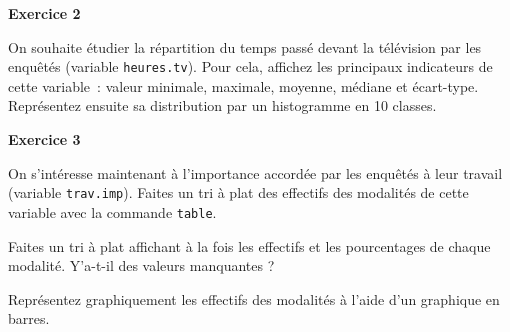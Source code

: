 \documentclass[12pt,]{book}
\newenvironment{Shaded}{\begin{snugshade}}{\end{snugshade}}
\newcommand{\DataTypeTok}[1]{\textcolor[rgb]{0.27,0.27,0.27}{#1}}
\newcommand{\DecValTok}[1]{\textcolor[rgb]{0.06,0.06,0.06}{#1}}
\newcommand{\KeywordTok}[1]{\textcolor[rgb]{0.27,0.27,0.27}{\textbf{#1}}}
\newcommand{\NormalTok}[1]{#1}
\newcommand{\OperatorTok}[1]{\textcolor[rgb]{0.43,0.43,0.43}{\textbf{#1}}}
\begin{document}
\textbf{Exercice 2}

On souhaite étudier la répartition du temps passé devant la télévision par les enquêtés (variable \texttt{heures.tv}). Pour cela, affichez les principaux indicateurs de cette variable~: valeur minimale, maximale, moyenne, médiane et écart-type. Représentez ensuite sa distribution par un histogramme en 10 classes.

\textbf{Exercice 3}

On s'intéresse maintenant à l'importance accordée par les enquêtés à leur travail (variable \texttt{trav.imp}). Faites un tri à plat des effectifs des modalités de cette variable avec la commande \texttt{table}.

\iffalse

\begin{Shaded}
\begin{Highlighting}[]
\KeywordTok{table}\NormalTok{(df}\OperatorTok{$}\NormalTok{trav.imp)}
\end{Highlighting}
\end{Shaded}

\fi

Faites un tri à plat affichant à la fois les effectifs et les pourcentages de chaque modalité. Y'a-t-il des valeurs manquantes ?

Représentez graphiquement les effectifs des modalités à l'aide d'un graphique en barres.

\iffalse
\end{document}
